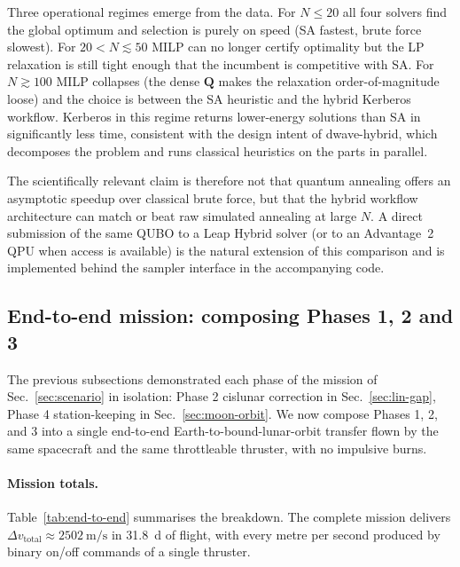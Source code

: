 \documentclass[11pt,a4paper]{article}
\theoremstyle{plain}
\newcommand{\bvec}[1]{\bm{#1}}
\newcommand{\Qmat}{\bvec{Q}}
\begin{document}
Three operational regimes emerge from the data. For $N \le 20$
all four solvers find the global optimum and selection is purely
on speed (SA fastest, brute force slowest). For $20 < N \lesssim
50$ MILP can no longer certify optimality but the LP relaxation
is still tight enough that the incumbent is competitive with
SA. For $N \gtrsim 100$ MILP collapses (the dense $\Qmat$ makes
the relaxation order-of-magnitude loose) and the choice is
between the SA heuristic and the hybrid Kerberos workflow.
Kerberos in this regime returns lower-energy solutions than
SA in significantly less time, consistent with the design
intent of dwave-hybrid, which decomposes the problem and runs
classical heuristics on the parts in parallel.

The scientifically relevant claim is therefore not that quantum
annealing offers an asymptotic speedup over classical brute force, but that the hybrid workflow architecture can
match or beat raw simulated annealing at large $N$. A direct
submission of the same QUBO to a Leap Hybrid solver (or to an
Advantage~2 QPU when access is available) is the natural
extension of this comparison and is implemented behind the
sampler interface in the accompanying code.

\subsection{End-to-end mission: composing Phases 1, 2 and
  3}\label{sec:end-to-end}

The previous subsections demonstrated each phase of the mission of
Sec.~\ref{sec:scenario} in isolation: Phase 2 cislunar correction
in Sec.~\ref{sec:lin-gap}, Phase 4 station-keeping in
Sec.~\ref{sec:moon-orbit}. We now compose Phases 1, 2, and 3 into a
single end-to-end Earth-to-bound-lunar-orbit transfer flown by the
same spacecraft and the same throttleable thruster, with no
impulsive burns.

\paragraph{Mission totals.} Table~\ref{tab:end-to-end} summarises
the breakdown. The complete mission delivers
$\Delta v_\mathrm{total} \approx
 \SI{2502}{\meter\per\second}$ in
\SI{31.8}{\day} of flight, with every metre per second produced
by binary on/off commands of a single thruster.
\end{document}
